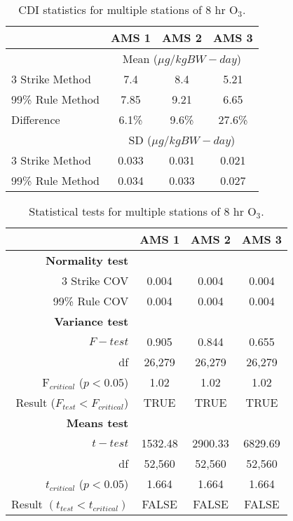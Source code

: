 % 
\begin{table}[H]
\centering
\caption{CDI statistics for multiple stations of 8 hr O$_{3}$.}
\label{tb16:CDI-O3}
\begin{tabular}{@{}lccc@{}}
\toprule
 & \textbf{AMS 1} & \textbf{AMS 2} & \textbf{AMS 3} \\ \midrule
 & \multicolumn{3}{c}{Mean ($\mu g/kgBW-day$)} \\
3 Strike Method & 7.4 & 8.4 & 5.21 \\
99\% Rule Method & 7.85 & 9.21 & 6.65 \\
Difference & 6.1\% & 9.6\% & 27.6\% \\
 & \multicolumn{3}{c}{SD ($\mu g/kgBW-day$)} \\
3 Strike Method & 0.033 & 0.031 & 0.021 \\
99\% Rule Method & 0.034 & 0.033 & 0.027 \\ \bottomrule
\end{tabular}
\end{table}

% 
\begin{table}[H]
\centering
\caption{Statistical tests for multiple stations of 8 hr O$_{3}$.}
\label{tb17:statmultiO3}
\begin{tabular}{@{}rccc@{}}
\toprule
 & \textbf{AMS 1} & \textbf{AMS 2} & \textbf{AMS 3} \\ \midrule
\textbf{Normality test} &  &  &  \\
3 Strike COV & 0.004 & 0.004 & 0.004 \\
99\% Rule COV & 0.004 & 0.004 & 0.004 \\
\textbf{Variance test} &  &  &  \\
$F-test$ & 0.905 & 0.844 & 0.655 \\
df & 26,279 & 26,279 & 26,279 \\
F$_{critical}$ ($p<0.05$) & 1.02 & 1.02 & 1.02 \\
Result ($F_{test} < F_{critical}$) & TRUE & TRUE & TRUE \\
\textbf{Means test} &  &  &  \\
$t-test$ & 1532.48 & 2900.33 & 6829.69 \\
df & 52,560 & 52,560 & 52,560 \\
$t_{critical}$ ($p<0.05$) & 1.664 & 1.664 & 1.664 \\
Result $(t_{test} < t_{critical})$ & FALSE & FALSE & FALSE \\ \bottomrule
\end{tabular}
\end{table}

